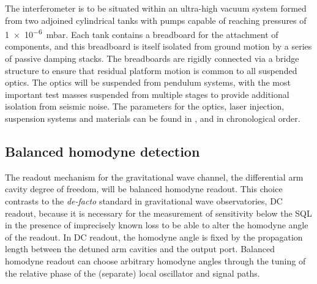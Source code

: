 The interferometer is to be situated within an ultra-high vacuum system formed from two adjoined cylindrical tanks with pumps capable of reaching pressures of \SI{1e-6}{\milli\bar}. Each tank contains a breadboard for the attachment of components, and this breadboard is itself isolated from ground motion by a series of passive damping stacks. The breadboards are rigidly connected via a bridge structure to ensure that residual platform motion is common to all suspended optics. The optics will be suspended from pendulum systems, with the most important test masses suspended from multiple stages to provide additional isolation from seismic noise. The parameters for the optics, laser injection, suspension systems and materials can be found in \cite{Graef2014}, \cite{Danilishin2015} and \cite{Leavey2016} in chronological order.

\subsection{\label{sec:bhd-intro}Balanced homodyne detection}
The readout mechanism for the gravitational wave channel, the differential arm cavity degree of freedom, will be balanced homodyne readout. This choice contrasts to the \emph{de-facto} standard in gravitational wave observatories, \gls{DC} readout, because it is necessary for the measurement of sensitivity below the \gls{SQL} in the presence of imprecisely known loss to be able to alter the homodyne angle of the readout. In \gls{DC} readout, the homodyne angle is fixed by the propagation length between the detuned arm cavities and the output port. Balanced homodyne readout can choose arbitrary homodyne angles through the tuning of the relative phase of the (separate) local oscillator and signal paths.

